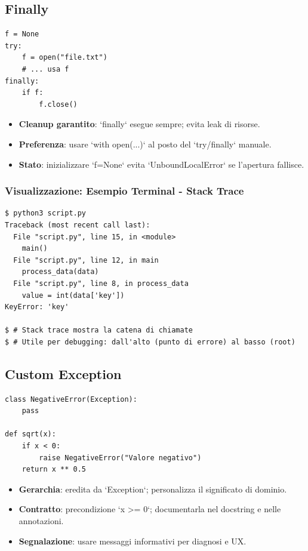 \subsection{Finally}
\begin{lstlisting}
f = None
try:
    f = open("file.txt")
    # ... usa f
finally:
    if f:
        f.close()
\end{lstlisting}
\begin{tcolorbox}[title=Spiegazione del codice]
\begin{itemize}
  \item \textbf{Cleanup garantito}: `finally` esegue sempre; evita leak di risorse.
  \item \textbf{Preferenza}: usare `with open(...)` al posto del `try/finally` manuale.
  \item \textbf{Stato}: inizializzare `f=None` evita `UnboundLocalError` se l'apertura fallisce.
\end{itemize}
\end{tcolorbox}

\subsubsection{Visualizzazione: Esempio Terminal - Stack Trace}
\begin{tcolorbox}[colback=black!5, colframe=black!70, title=Output Terminal - Stack Trace Completo, fonttitle=\bfseries\color{white}, coltitle=black]
\begin{lstlisting}[style=python]
$ python3 script.py
Traceback (most recent call last):
  File "script.py", line 15, in <module>
    main()
  File "script.py", line 12, in main
    process_data(data)
  File "script.py", line 8, in process_data
    value = int(data['key'])
KeyError: 'key'

$ # Stack trace mostra la catena di chiamate
$ # Utile per debugging: dall'alto (punto di errore) al basso (root)
\end{lstlisting}
\end{tcolorbox}

\subsection{Custom Exception}
\begin{lstlisting}
class NegativeError(Exception):
    pass

def sqrt(x):
    if x < 0:
        raise NegativeError("Valore negativo")
    return x ** 0.5
\end{lstlisting}
\begin{tcolorbox}[title=Spiegazione del codice]
\begin{itemize}
  \item \textbf{Gerarchia}: eredita da `Exception`; personalizza il significato di dominio.
  \item \textbf{Contratto}: precondizione `x >= 0`; documentarla nel docstring e nelle annotazioni.
  \item \textbf{Segnalazione}: usare messaggi informativi per diagnosi e UX.
\end{itemize}
\end{tcolorbox}

